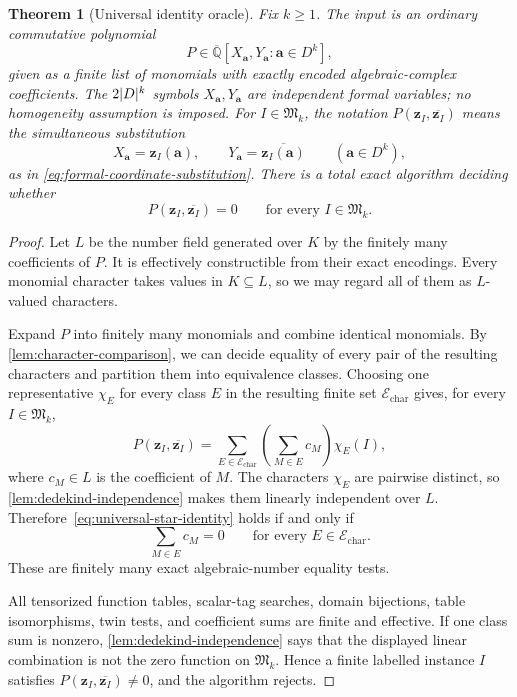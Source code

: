 \documentclass[11pt]{article}
\theoremstyle{plain}
\newtheorem{theorem}{Theorem}[section]
\theoremstyle{definition}
\theoremstyle{remark}
\newcommand{\AlgNums}{\overline{\mathbb Q}}
\newcommand{\zvec}[1]{\mathbf z_{#1}}
\newcommand{\InstMonoid}[1]{\mathfrak M_{#1}}
\DeclarePairedDelimiter{\abs}{\lvert}{\rvert}
\begin{document}
\begin{theorem}[Universal identity oracle]
\label{thm:universal-identity}
Fix $k\ge1$.  The input is an ordinary commutative polynomial
\[
  P\in\AlgNums[X_{\mathbf a},Y_{\mathbf a}:\mathbf a\in D^k],
\]
given as a finite list of monomials with exactly encoded algebraic-complex
coefficients.  The $2\abs{D}^k$ symbols
$X_{\mathbf a},Y_{\mathbf a}$ are independent formal variables; no
homogeneity assumption is imposed.  For $I\in\InstMonoid{k}$, the notation
$P(\zvec I,\overline{\zvec I})$ means the simultaneous substitution
\begin{equation*}
  X_{\mathbf a}=\zvec I(\mathbf a),
  \qquad
  Y_{\mathbf a}=\overline{\zvec I(\mathbf a)}
  \qquad(\mathbf a\in D^k),
\end{equation*}
as in \eqref{eq:formal-coordinate-substitution}.  There is a total exact
algorithm deciding whether
\begin{equation}
  P(\zvec I,\overline{\zvec I})=0
  \qquad\text{for every }I\in\InstMonoid{k}.
  \label{eq:universal-star-identity}
\end{equation}
\end{theorem}

\begin{proof}
Let $L$ be the number field generated over $K$ by the finitely many
coefficients of $P$.  It is effectively constructible from their exact
encodings.  Every monomial character takes values in $K\subseteq L$, so we
may regard all of them as $L$-valued characters.

Expand $P$ into finitely many monomials and combine identical monomials.  By
\cref{lem:character-comparison}, we can decide equality of every pair of the
resulting characters and partition them into equivalence classes.  Choosing
one representative $\chi_E$ for every class $E$ in the resulting finite set
$\mathcal E_{\mathrm{char}}$ gives, for every
$I\in\InstMonoid{k}$,
\[
  P(\zvec I,\overline{\zvec I})
  =\sum_{E\in\mathcal E_{\mathrm{char}}}
     \left(\sum_{M\in E}c_M\right)\chi_E(I),
\]
where $c_M\in L$ is the coefficient of $M$.  The characters $\chi_E$ are
pairwise distinct, so \cref{lem:dedekind-independence} makes them linearly
independent over $L$.  Therefore~\eqref{eq:universal-star-identity} holds if
and only if
\[
  \sum_{M\in E}c_M=0
  \qquad\text{for every }E\in\mathcal E_{\mathrm{char}}.
\]
These are finitely many exact algebraic-number equality tests.

All tensorized function tables, scalar-tag searches, domain bijections, table
isomorphisms, twin tests, and coefficient sums are finite and effective.  If
one class sum is nonzero, \cref{lem:dedekind-independence} says that the
displayed linear combination is not the zero function on $\InstMonoid{k}$.
Hence a
finite labelled instance $I$ satisfies
$P(\zvec I,\overline{\zvec I})\ne0$, and the algorithm rejects.
\end{proof}
\end{document}
